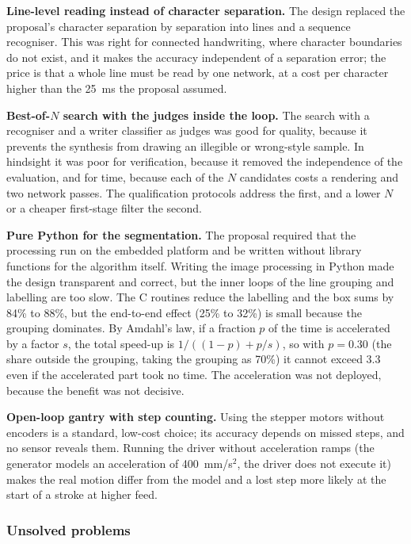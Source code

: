         \textbf{Line-level reading instead of character separation.}
        The design replaced the proposal's character separation by separation into lines and a sequence recogniser.
        This was right for connected handwriting, where character boundaries do not exist, and it makes the accuracy independent of a separation error; the price is that a whole line must be read by one network, at a cost per character higher than the 25~ms the proposal assumed.

        \textbf{Best-of-$N$ search with the judges inside the loop.}
        The search with a recogniser and a writer classifier as judges was good for quality, because it prevents the synthesis from drawing an illegible or wrong-style sample.
        In hindsight it was poor for verification, because it removed the independence of the evaluation, and for time, because each of the $N$ candidates costs a rendering and two network passes.
        The qualification protocols address the first, and a lower $N$ or a cheaper first-stage filter the second.

        \textbf{Pure Python for the segmentation.}
        The proposal required that the processing run on the embedded platform and be written without library functions for the algorithm itself.
        Writing the image processing in Python made the design transparent and correct, but the inner loops of the line grouping and labelling are too slow.
        The C routines reduce the labelling and the box sums by 84\% to 88\%, but the end-to-end effect (25\% to 32\%) is small because the grouping dominates.
        By Amdahl's law, if a fraction $p$ of the time is accelerated by a factor $s$, the total speed-up is $1/((1-p)+p/s)$, so with $p=0.30$ (the share outside the grouping, taking the grouping as 70\%) it cannot exceed $3.3$ even if the accelerated part took no time.
        The acceleration was not deployed, because the benefit was not decisive.

        \textbf{Open-loop gantry with step counting.}
        Using the stepper motors without encoders is a standard, low-cost choice; its accuracy depends on missed steps, and no sensor reveals them.
        Running the driver without acceleration ramps (the generator models an acceleration of 400~mm/s$^2$, the driver does not execute it) makes the real motion differ from the model and a lost step more likely at the start of a stroke at higher feed.


    \subsubsection{Unsolved problems}
    \label{sec:dis-unsolved}

